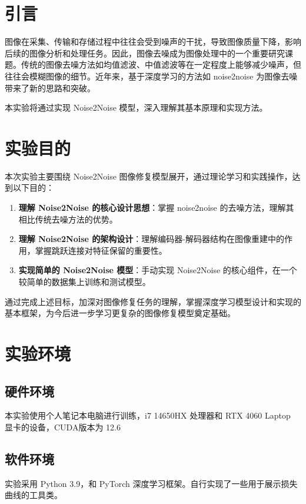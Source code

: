 \documentclass[UTF8]{ctexart}
\begin{document}
\tableofcontents  %

\newpage
\section{引言}

图像在采集、传输和存储过程中往往会受到噪声的干扰，导致图像质量下降，影响后续的图像分析和处理任务。因此，图像去噪成为图像处理中的一个重要研究课题。传统的图像去噪方法如均值滤波、中值滤波等在一定程度上能够减少噪声，但往往会模糊图像的细节。近年来，基于深度学习的方法如 noise2noise 为图像去噪带来了新的思路和突破。

本实验将通过实现 Noise2Noise 模型，深入理解其基本原理和实现方法。

\section{实验目的}
本次实验主要围绕 Noise2Noise 图像修复模型展开，通过理论学习和实践操作，达到以下目的：
\begin{enumerate}
    \item \textbf{理解 Noise2Noise 的核心设计思想}：掌握 noise2noise 的去噪方法，理解其相比传统去噪方法的优势。
    \item \textbf{理解 Noise2Noise 的架构设计}：理解编码器-解码器结构在图像重建中的作用，掌握跳跃连接对特征保留的重要性。
    \item \textbf{实现简单的 Noise2Noise 模型}：手动实现 Noise2Noise 的核心组件，在一个较简单的数据集上训练和测试模型。
\end{enumerate}

通过完成上述目标，加深对图像修复任务的理解，掌握深度学习模型设计和实现的基本框架，为今后进一步学习更复杂的图像修复模型奠定基础。

\section{实验环境}
\subsection{硬件环境}
本实验使用个人笔记本电脑进行训练，i7 14650HX 处理器和 RTX 4060 Laptop 显卡的设备，CUDA版本为 12.6

\subsection{软件环境}
实验采用 Python 3.9，和 PyTorch 深度学习框架。自行实现了一些用于展示损失曲线的工具类。
\end{document}
